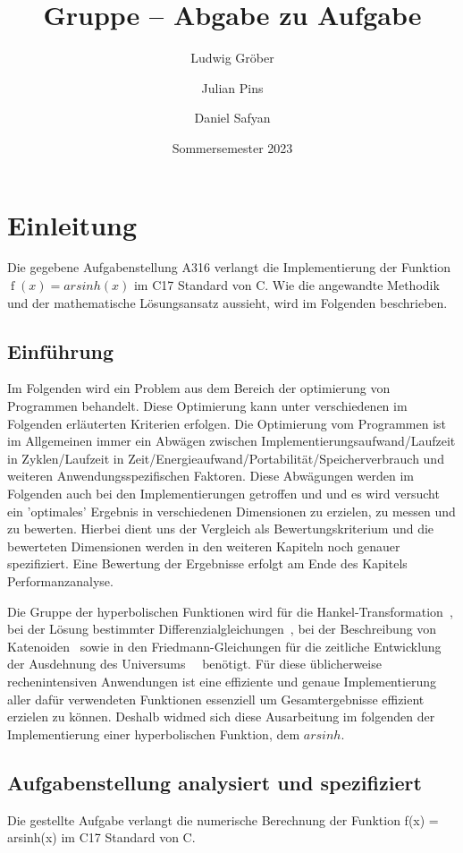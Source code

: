 \documentclass[course=erap] {aspdoc}
\author{Ludwig Gröber \and Julian Pins \and Daniel Safyan}
\date{Sommersemester 2023} %
\title{Gruppe \theGroup{} -- Abgabe zu Aufgabe \theNumber}
\begin{document}
    \maketitle


    \section{Einleitung}
    Die gegebene Aufgabenstellung A316 verlangt die Implementierung der Funktion $\operatorname{f}(x) = arsinh(x)$ im C17 Standard von C.
    Wie die angewandte Methodik und der mathematische Lösungsansatz aussieht, wird im Folgenden beschrieben.

    \subsection{Einführung}
    Im Folgenden wird ein Problem aus dem Bereich der optimierung von Programmen behandelt.
    Diese Optimierung kann unter verschiedenen im Folgenden erläuterten Kriterien erfolgen.
    Die Optimierung vom Programmen ist im Allgemeinen immer ein Abwägen zwischen Implementierungsaufwand/Laufzeit in Zyklen/Laufzeit in Zeit/Energieaufwand/Portabilität/Speicherverbrauch und weiteren Anwendungsspezifischen Faktoren.
    Diese Abwägungen werden im Folgenden auch bei den Implementierungen getroffen und und es wird versucht ein 'optimales' Ergebnis in verschiedenen Dimensionen zu erzielen, zu messen und zu bewerten.
    Hierbei dient uns der Vergleich als Bewertungskriterium und die bewerteten Dimensionen werden in den weiteren Kapiteln noch genauer spezifiziert.
    Eine Bewertung der Ergebnisse erfolgt am Ende des Kapitels Performanzanalyse.

    Die Gruppe der hyperbolischen Funktionen wird für die Hankel-Transformation~\cite{hankel},
    bei der Lösung bestimmter Differenzialgleichungen~\cite{differenzial}, bei der Beschreibung von Katenoiden~\cite{katenoid}
    sowie in den Friedmann-Gleichungen für die zeitliche Entwicklung der Ausdehnung des Universums~\cite{universum1,universum2}~ benötigt.
    Für diese üblicherweise rechenintensiven Anwendungen ist eine effiziente und genaue Implementierung aller dafür verwendeten Funktionen essenziell um Gesamtergebnisse effizient erzielen zu können.
    Deshalb widmed sich diese Ausarbeitung im folgenden der Implementierung einer hyperbolischen Funktion, dem $arsinh$.

    \subsection{Aufgabenstellung analysiert und spezifiziert}
    Die gestellte Aufgabe verlangt die numerische Berechnung der Funktion f(x) = arsinh(x) im C17 Standard von C.
\end{document}

